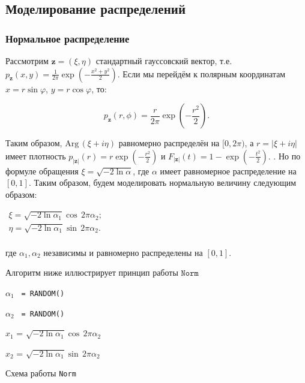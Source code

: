 \documentclass[a4paper,12pt]{article}
\numberwithin{equation}{section}
\newcommand{\Arg}{\mathrm{Arg}\,}
\begin{document}
	\subsection{Моделирование распределений}
	\subsubsection{Нормальное распределение}
	
	Рассмотрим $\mathbf{z} = (\xi, \eta)$ стандартный гауссовский вектор, т.е. $p_{\mathbf{z}}(x,y) = \frac{1}{2 \pi} \exp \left(-\frac{x^2 + y^2}{2} \right)$. Если мы перейдём к полярным координатам $x=r \sin \varphi$, $y= r \cos \varphi$, то:
	
	\begin{equation}
		p_{\mathbf{z}}(r , \phi) = \frac{r}{2 \pi} \exp \left(-\frac{r^2}{2} \right).
	\end{equation}
	
	Таким образом, $\Arg (\xi+i \eta) $ равномерно распределён на $[0, 2 \pi)$, а $r = |\xi+i \eta|$ имеет плотность $p_{|\mathbf{z}|}(r) =  r\exp \left(-\frac{r^2}{2} \right)$ и  $F_{|\mathbf{z}|}(t) = 1-\exp \left(-\frac{t^2}{2} \right)$. . Но по формуле обращения $\xi = \sqrt{-2 \ln \alpha}$, где $\alpha$ имеет равномерное распределение на $[0,1]$. Таким образом, будем моделировать нормальную величину следующим образом:
	
	$
	\begin{array}{l}
	\xi = \sqrt{-2 \ln \alpha_1} \cos \, 2 \pi \alpha_2;\\
	\eta = \sqrt{-2 \ln \alpha_1} \sin \, 2 \pi \alpha_2.\\
	\end{array}
	$
	
	где $\alpha_1, \alpha_2$ независимы и равномерно распределены на $[0,1]$.
	
	Алгоритм ниже иллюстрирует принцип работы $\texttt{Norm}$
	
	\begin{algorithm}[H]
		\SetAlgoLined %
		
		
		
		$\alpha_1$ \texttt{ = RANDOM()}
		
		$\alpha_2$ \texttt{ = RANDOM()}
		
		$x_1$  = $\sqrt{-2 \ln \alpha_1} \cos \, 2 \pi \alpha_2$
		
		$x_2$  = $\sqrt{-2 \ln \alpha_1} \sin \, 2 \pi \alpha_2$
		
		\caption{Схема работы \texttt{Norm}}
	\end{algorithm}
\end{document}
